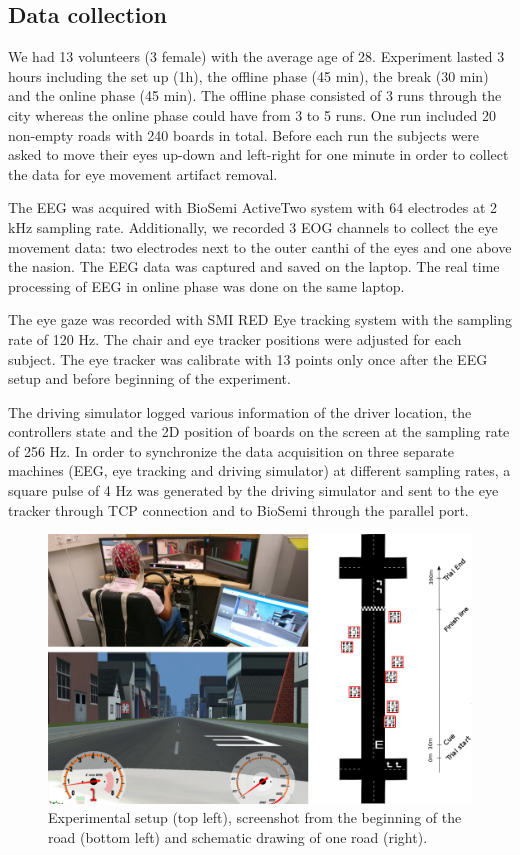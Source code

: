 \documentclass[12pt]{iopart}
\begin{document}
\subsection{Data collection}
We had 13 volunteers (3 female) with the average age of 28.
Experiment lasted 3 hours including the set up (1h), the offline phase (45 min),
the break (30 min) and the online phase (45 min).
The offline phase consisted of 3 runs through the city  whereas the online
phase could have from 3 to 5 runs.
One run included 20 non-empty roads with 240 boards in total.
Before each run the subjects were asked to move their eyes up-down and left-right
for one minute in order to collect the data for eye movement artifact removal.

The EEG was acquired with BioSemi ActiveTwo system with 64 electrodes at 2 kHz sampling rate.
Additionally, we recorded 3 EOG channels to collect the eye movement data:
two electrodes next to the outer canthi of the eyes and one above the nasion.
The EEG data was captured and saved on the laptop. The real time processing
of EEG in online phase was done on the same laptop.

The eye gaze was recorded with SMI RED Eye tracking system with the sampling rate of 120 Hz.
The chair and eye tracker positions were adjusted for each subject. The eye tracker
was calibrate with 13 points only once after the EEG setup and before beginning of 
the experiment.

The driving simulator logged various information of the driver location,
the controllers state and the 2D position of boards on the screen at the sampling rate
of 256 Hz. In order to synchronize the data acquisition on three separate machines
(EEG, eye tracking and driving simulator) at different sampling rates,
a square pulse of 4 Hz was generated by the driving simulator and sent 
to the eye tracker through TCP connection and to BioSemi through the parallel port.



\begin{figure}[!t]
    \includegraphics[trim={0cm 0cm 0cm 0cm},clip,width=0.8\columnwidth]{../images/setup_protocol2.png}
    \caption{Experimental setup (top left), screenshot from the beginning of the road (bottom left)
    and schematic drawing of one road (right).}
\label{fig:setup}
\end{figure}
\end{document}
